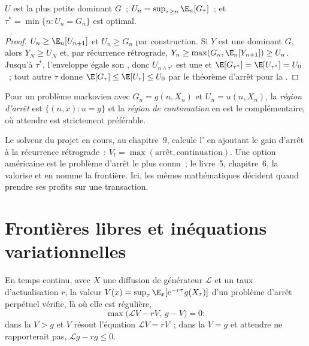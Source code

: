 \begin{theorem}\label{thm:qm:optimal-stopping-and-impulse-control:snell}
$U$ est la plus petite  dominant $G$~; $U_n = \sup_{\tau \ge n}\E_n[G_\tau]$~; et $\tau^* = \min\{n : U_n = G_n\}$ est
optimal.
\end{theorem}

\begin{proof}
$U_n \ge \E_n[U_{n+1}]$ et $U_n \ge G_n$ par construction. Si $Y$ est une  dominant $G$, alors $Y_N \ge
U_N$ et, par récurrence rétrograde, $Y_n \ge \max(G_n, \E_n[Y_{n+1}]) \ge U_n$. Jusqu'à $\tau^*$, l'enveloppe égale son , donc $U_{n\wedge\tau^*}$ est une  et $\E[G_{\tau^*}] = \E[U_{\tau^*}] = U_0$~; tout autre $\tau$ donne $\E[G_\tau] \le
\E[U_\tau] \le U_0$ par le théorème d'arrêt pour la .
\end{proof}

\begin{definition}\label{def:qm:optimal-stopping-and-impulse-control:regions}
Pour un problème markovien avec $G_n = g(n, X_n)$ et $U_n = u(n, X_n)$, la \emph{région d'arrêt} est
$\{(n, x) : u = g\}$ et la \emph{région de continuation} en est le complémentaire, où attendre est
strictement préférable.
\end{definition}

Le solveur du projet en cours, au chapitre~9, calcule l' en ajoutant le gain d'arrêt
à la récurrence rétrograde~: $V_t = \max(\text{arrêt}, \text{continuation})$. Une option américaine est le problème d'arrêt le plus connu~;
le livre~5, chapitre~6, la valorise et en nomme la frontière. Ici, les mêmes mathématiques décident
quand prendre ses profits sur une transaction.

\section{Frontières libres et inéquations variationnelles}

En temps continu, avec $X$ une diffusion de générateur $\mathcal L$ et un taux d'actualisation $r$, la valeur $V(x) =
\sup_\tau\E_x[e^{-r\tau}g(X_\tau)]$ d'un problème d'arrêt perpétuel vérifie, là où elle est régulière,
\[
\max\bigl(\mathcal LV - rV,\ g - V\bigr) = 0:
\]
dans la  $V > g$ et $V$ résout l'équation $\mathcal LV = rV$~; dans la  $V = g$ et
attendre ne rapporterait pas, $\mathcal Lg - rg \le 0$.

